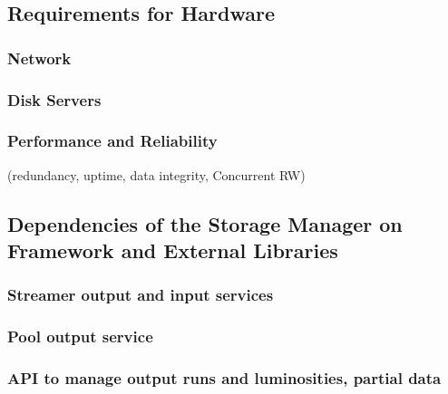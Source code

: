 \subsection{Requirements for Hardware}

\subsubsection{Network}

\subsubsection{Disk Servers}

\subsubsection{Performance and Reliability}

(redundancy, uptime, data integrity, Concurrent RW)


\subsection{Dependencies of the Storage Manager on Framework and External Libraries}

\subsubsection{Streamer output and input services}

\subsubsection{Pool output service}

\subsubsection{API to manage output runs and luminosities, partial data}
